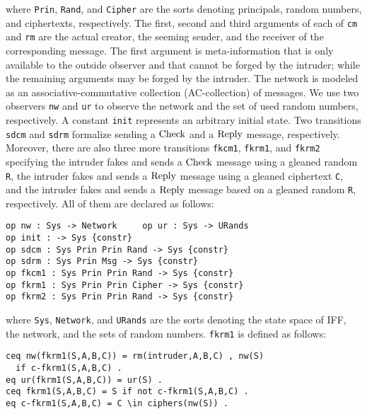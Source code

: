 \documentclass[a4paper,fleqn]{cas-dc}
\begin{document}
\noindent
where  \verb!Prin!, \verb!Rand!, and \verb!Cipher! are the sorts denoting principals, random numbers, and ciphertexts, respectively.
The first, second and third arguments of each of \verb!cm! and \verb!rm! are the actual creator, the seeming sender, and the receiver of the corresponding message. The first argument is meta-information that is only available to the outside observer and that cannot be forged by the intruder; while the remaining arguments may be forged by the intruder. 
The network is modeled as an associative-commutative collection (AC-collection) of messages. 
We use two observers \verb!nw! and \verb!ur! to observe the network and the set of used random numbers, respectively.
A constant \verb!init! represents an arbitrary initial state.
Two transitions \verb!sdcm! and \verb!sdrm! formalize sending a $\rm Check$ and a $\rm Reply$ message, respectively.
Moreover,  there are also three more transitions \verb!fkcm1!, \verb!fkrm1!, and \verb!fkrm2! specifying the intruder fakes and sends a $\rm Check$ message using a gleaned random \verb!R!, 
the intruder fakes and sends a $\rm Reply$ message using a gleaned ciphertext \verb!C!, and
the intruder fakes and sends a $\rm Reply$ message based on a gleaned random \verb!R!, respectively.
All of them are declared as follows:

\begin{small}
\begin{verbatim}
op nw : Sys -> Network     op ur : Sys -> URands
op init : -> Sys {constr}
op sdcm : Sys Prin Prin Rand -> Sys {constr}
op sdrm : Sys Prin Msg -> Sys {constr} 
op fkcm1 : Sys Prin Prin Rand -> Sys {constr} 
op fkrm1 : Sys Prin Prin Cipher -> Sys {constr} 
op fkrm2 : Sys Prin Prin Rand -> Sys {constr}
\end{verbatim}
\end{small}

\noindent
where \verb!Sys!, \verb!Network!, and \verb!URands! are the sorts denoting the state space of IFF, the network,  and the sets of random numbers.
\verb!fkrm1! is defined as follows:

\begin{small}
	\begin{verbatim}
ceq nw(fkrm1(S,A,B,C)) = rm(intruder,A,B,C) , nw(S) 
  if c-fkrm1(S,A,B,C) .
eq ur(fkrm1(S,A,B,C)) = ur(S) .
ceq fkrm1(S,A,B,C) = S if not c-fkrm1(S,A,B,C) .
eq c-fkrm1(S,A,B,C) = C \in ciphers(nw(S)) .
	\end{verbatim}
\end{small}
\end{document}
